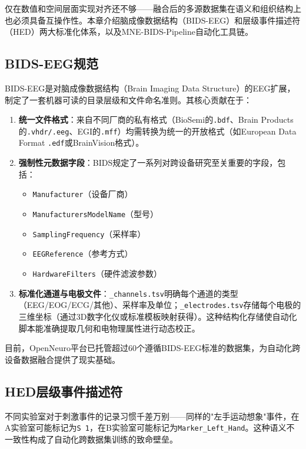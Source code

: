 \documentclass[12pt, a4paper]{article}
\begin{document}
仅在数值和空间层面实现对齐还不够——融合后的多源数据集在语义和组织结构上也必须具备互操作性。本章介绍脑成像数据结构（BIDS-EEG）和层级事件描述符（HED）两大标准化体系，以及MNE-BIDS-Pipeline自动化工具链。

\subsection{BIDS-EEG规范}

BIDS-EEG是对脑成像数据结构（Brain Imaging Data Structure）的EEG扩展\citep{Pernet2019BIDS}，制定了一套机器可读的目录层级和文件命名准则。其核心贡献在于：

\begin{enumerate}[leftmargin=2em]
  \item \textbf{统一文件格式}：来自不同厂商的私有格式（BioSemi的\texttt{.bdf}、Brain Products的\texttt{.vhdr/.eeg}、EGI的\texttt{.mff}）均需转换为统一的开放格式（如European Data Format \texttt{.edf}或BrainVision格式）。

  \item \textbf{强制性元数据字段}：BIDS规定了一系列对跨设备研究至关重要的字段，包括：
    \begin{itemize}
      \item \texttt{Manufacturer}（设备厂商）
      \item \texttt{ManufacturersModelName}（型号）
      \item \texttt{SamplingFrequency}（采样率）
      \item \texttt{EEGReference}（参考方式）
      \item \texttt{HardwareFilters}（硬件滤波参数）
    \end{itemize}

  \item \textbf{标准化通道与电极文件}：\texttt{\_channels.tsv}明确每个通道的类型（EEG/EOG/ECG/其他）、采样率及单位；\texttt{\_electrodes.tsv}存储每个电极的三维坐标（通过3D数字化仪或标准模板映射获得）。这种结构化存储使自动化脚本能准确提取几何和电物理属性进行动态校正。
\end{enumerate}

目前，OpenNeuro平台已托管超过60个遵循BIDS-EEG标准的数据集\citep{Markiewicz2021OpenNeuro}，为自动化跨设备数据融合提供了现实基础。

\subsection{HED层级事件描述符}

不同实验室对于刺激事件的记录习惯千差万别——同样的"左手运动想象"事件，在A实验室可能标记为\texttt{S 1}，在B实验室可能标记为\texttt{Marker\_Left\_Hand}。这种语义不一致性构成了自动化跨数据集训练的致命壁垒。
\end{document}
